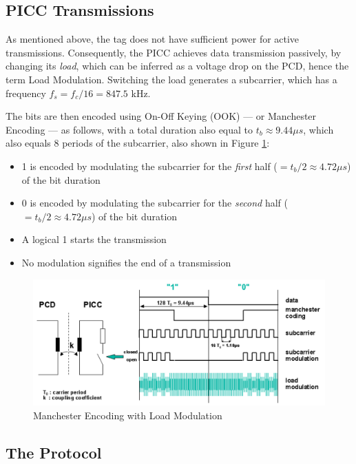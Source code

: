 \documentclass[fleqn,10pt]{SelfArx} %
\newcommand{\ms}{\ensuremath{\mu s} }
\begin{document}
\subsection{PICC Transmissions}
\label{subsec:picc}

As mentioned above, the tag does not have sufficient power for active transmissions. Consequently, the PICC achieves data transmission passively, by changing its {\em load}, which can be inferred as a voltage drop on the PCD, hence the term Load Modulation. Switching the load generates a subcarrier, which has a frequency $f_s=f_c/16=847.5$ kHz. 

The bits are then encoded using On-Off Keying (OOK) --- or Manchester Encoding --- as follows, with a total duration also equal to $t_b\approx9.44\ms$, which also equals 8 periods of the subcarrier, also shown in Figure \ref{fig:manchester}:

\begin{itemize}[noitemsep] 
\item 1 is encoded by modulating the subcarrier for the {\em first} half ($=t_b/2\approx4.72\ms$) of the bit duration
\item 0  is encoded by modulating the subcarrier for the {\em second} half ($=t_b/2\approx4.72\ms$) of the bit duration
\item A logical 1 starts the transmission
\item No modulation signifies the end of a transmission
\end{itemize}


\begin{figure}[tp]
  \includegraphics[width=\linewidth]{img/manchester}
  \caption{Manchester Encoding with Load Modulation \cite{mifare}}
  \label{fig:manchester}
\end{figure}


\subsection{The Protocol}
\label{subsec:protocol}
\end{document}
